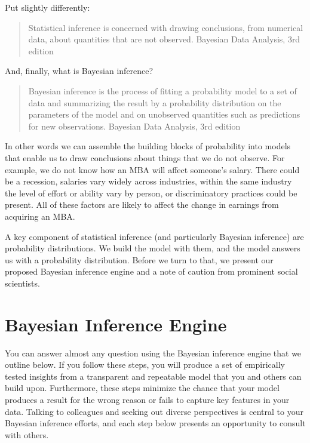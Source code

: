 \documentclass[]{article}
\begin{document}
Put slightly differently: 
\begin{quote}
Statistical inference is concerned with drawing conclusions, from numerical data, about quantities that are not observed.
Bayesian Data Analysis, 3rd edition
\end{quote}

And, finally, what is Bayesian inference? 
\begin{quote}
Bayesian inference is the process of fitting a probability model to a set of data and summarizing the result by a probability distribution on the parameters of the model and on unobserved quantities such as predictions for new observations.
Bayesian Data Analysis, 3rd edition
\end{quote}

In other words we can assemble the building blocks of probability into models that enable us to draw conclusions about things that we do not observe. For example, we do not know how an MBA will affect someone's salary. There could be a recession, salaries vary widely across industries, within the same industry the level of effort or ability vary by person, or discriminatory practices could be present. All of these factors are likely to affect the change in earnings from acquiring an MBA.

A key component of statistical inference (and particularly Bayesian inference) are probability distributions. We build the model with them, and the model answers us with a probability distribution. Before we turn to that, we present our proposed Bayesian inference engine and a note of caution from prominent social scientists.

\newpage

\section{Bayesian Inference Engine}
You can answer almost any question using the Bayesian inference engine that we outline below. If you follow these steps, you will produce a set of empirically tested insights from a transparent and repeatable model that you and others can build upon. Furthermore, these steps minimize the chance that your model produces a result for the wrong reason or fails to capture key features in your data. Talking to colleagues and seeking out diverse perspectives is central to your Bayesian inference efforts, and each step below presents an opportunity to consult with others.
\end{document}

